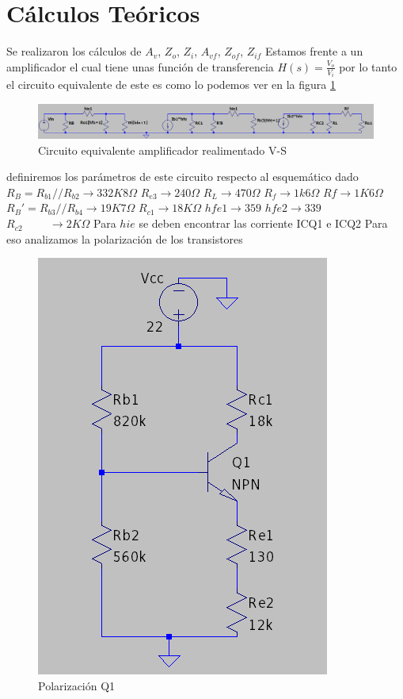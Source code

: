 \documentclass[12pt, letterpaper]{article}
\begin{document}
\section{Cálculos Teóricos}
Se realizaron los cálculos de $A_v$, $Z_o$, $Z_i$, $A_{vf}$, $Z_{of}$, $Z_{if}$
\singlespacing
Estamos frente a un amplificador el cual tiene unas función de transferencia $H(s)=\frac{V_o}{V_i}
$ por lo tanto el circuito equivalente de este es como lo podemos ver en la figura \ref{fig:cir_equivalente_señal}
\begin{figure}[h]
	\centering
	\includegraphics[width=1\textwidth]{Imagenes/circeq.png}
	\caption{Circuito equivalente amplificador realimentado V-S}
	\label{fig:cir_equivalente_señal}
\end{figure}
\singlespacing
definiremos los parámetros de este circuito respecto al esquemático dado
\singlespacing
$R_B=R_{b1}//R_{b2} \rightarrow 332K8\Omega$\hspace{1cm} 
\singlespacing
$R_{e3} \rightarrow 240\Omega$\hspace{1cm} $R_{L} \rightarrow 470\Omega$ \hspace{1cm} $R_{f} \rightarrow 1k6\Omega$
\singlespacing
$Rf \rightarrow 1K6\Omega$ \hspace{1cm} $R_B'=R_{b3}//R_{b4} \rightarrow 19K7\Omega$ \hspace{1cm} $R_{c1} \rightarrow18K\Omega$
\singlespacing
$hfe1 \rightarrow 359$ \hspace{1cm} $hfe2 \rightarrow 339$ $R_{c2} \hspace{1cm} \rightarrow 2K\Omega$
\singlespacing
Para $hie$ se deben encontrar las corriente ICQ1 e ICQ2 Para eso analizamos la polarización de los transistores
\begin{figure}[h!]
	\centering
	\includegraphics[height=0.75\textwidth]{Imagenes/polarizacionQ1.png}
	\caption{Polarización Q1}
	\label{fig:2}
\end{figure}
\end{document}
